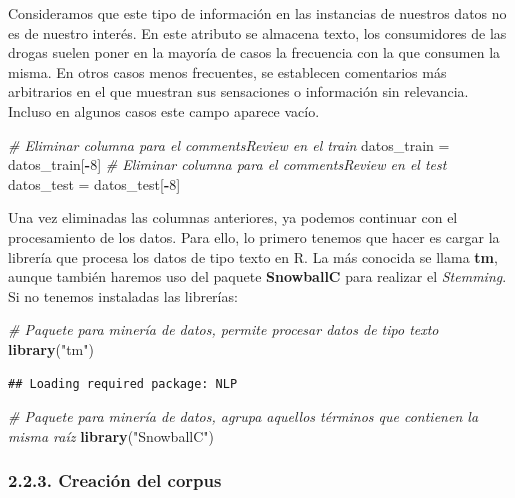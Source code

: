 \documentclass[spanish,]{article}
\newenvironment{Shaded}{\begin{snugshade}}{\end{snugshade}}
\newcommand{\CommentTok}[1]{\textcolor[rgb]{0.56,0.35,0.01}{\textit{#1}}}
\newcommand{\DecValTok}[1]{\textcolor[rgb]{0.00,0.00,0.81}{#1}}
\newcommand{\KeywordTok}[1]{\textcolor[rgb]{0.13,0.29,0.53}{\textbf{#1}}}
\newcommand{\NormalTok}[1]{#1}
\newcommand{\OperatorTok}[1]{\textcolor[rgb]{0.81,0.36,0.00}{\textbf{#1}}}
\newcommand{\StringTok}[1]{\textcolor[rgb]{0.31,0.60,0.02}{#1}}
\begin{document}
Consideramos que este tipo de información en las instancias de nuestros
datos no es de nuestro interés. En este atributo se almacena texto, los
consumidores de las drogas suelen poner en la mayoría de casos la
frecuencia con la que consumen la misma. En otros casos menos
frecuentes, se establecen comentarios más arbitrarios en el que muestran
sus sensaciones o información sin relevancia. Incluso en algunos casos
este campo aparece vacío.

\begin{Shaded}
\begin{Highlighting}[]
\CommentTok{# Eliminar columna para el commentsReview en el train}
\NormalTok{datos_train =}\StringTok{ }\NormalTok{datos_train[}\OperatorTok{-}\DecValTok{8}\NormalTok{]}
\CommentTok{# Eliminar columna para el commentsReview en el test}
\NormalTok{datos_test =}\StringTok{ }\NormalTok{datos_test[}\OperatorTok{-}\DecValTok{8}\NormalTok{]}
\end{Highlighting}
\end{Shaded}

Una vez eliminadas las columnas anteriores, ya podemos continuar con el
procesamiento de los datos. Para ello, lo primero tenemos que hacer es
cargar la librería que procesa los datos de tipo texto en R. La más
conocida se llama \textbf{tm}, aunque también haremos uso del paquete
\textbf{SnowballC} para realizar el \emph{Stemming}. Si no tenemos
instaladas las librerías:

\begin{Shaded}
\begin{Highlighting}[]
\CommentTok{# Paquete para minería de datos, permite procesar datos de tipo texto}
\KeywordTok{library}\NormalTok{(}\StringTok{"tm"}\NormalTok{)}
\end{Highlighting}
\end{Shaded}

\begin{verbatim}
## Loading required package: NLP
\end{verbatim}

\begin{Shaded}
\begin{Highlighting}[]
\CommentTok{# Paquete para minería de datos, agrupa aquellos términos que contienen la misma raíz}
\KeywordTok{library}\NormalTok{(}\StringTok{"SnowballC"}\NormalTok{)}
\end{Highlighting}
\end{Shaded}

\hypertarget{creacion-del-corpus}{%
\subsubsection{2.2.3. Creación del corpus}\label{creacion-del-corpus}}
\end{document}

